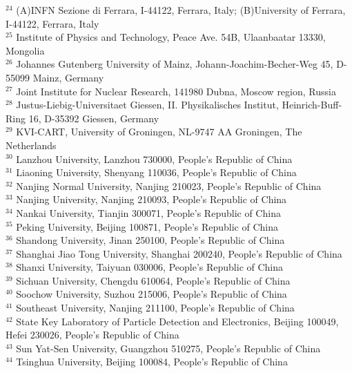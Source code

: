\begin{small}
\begin{center}
{$^{24}$ (A)INFN Sezione di Ferrara, I-44122, Ferrara, Italy; (B)University of Ferrara, I-44122, Ferrara, Italy\\
$^{25}$ Institute of Physics and Technology, Peace Ave. 54B, Ulaanbaatar 13330, Mongolia\\
$^{26}$ Johannes Gutenberg University of Mainz, Johann-Joachim-Becher-Weg 45, D-55099 Mainz, Germany\\
$^{27}$ Joint Institute for Nuclear Research, 141980 Dubna, Moscow region, Russia\\
$^{28}$ Justus-Liebig-Universitaet Giessen, II. Physikalisches Institut, Heinrich-Buff-Ring 16, D-35392 Giessen, Germany\\
$^{29}$ KVI-CART, University of Groningen, NL-9747 AA Groningen, The Netherlands\\
$^{30}$ Lanzhou University, Lanzhou 730000, People's Republic of China\\
$^{31}$ Liaoning University, Shenyang 110036, People's Republic of China\\
$^{32}$ Nanjing Normal University, Nanjing 210023, People's Republic of China\\
$^{33}$ Nanjing University, Nanjing 210093, People's Republic of China\\
$^{34}$ Nankai University, Tianjin 300071, People's Republic of China\\
$^{35}$ Peking University, Beijing 100871, People's Republic of China\\
$^{36}$ Shandong University, Jinan 250100, People's Republic of China\\
$^{37}$ Shanghai Jiao Tong University, Shanghai 200240, People's Republic of China\\
$^{38}$ Shanxi University, Taiyuan 030006, People's Republic of China\\
$^{39}$ Sichuan University, Chengdu 610064, People's Republic of China\\
$^{40}$ Soochow University, Suzhou 215006, People's Republic of China\\
$^{41}$ Southeast University, Nanjing 211100, People's Republic of China\\
$^{42}$ State Key Laboratory of Particle Detection and Electronics, Beijing 100049, Hefei 230026, People's Republic of China\\
$^{43}$ Sun Yat-Sen University, Guangzhou 510275, People's Republic of China\\
$^{44}$ Tsinghua University, Beijing 100084, People's Republic of China\\
}
\end{center}
\end{small}
